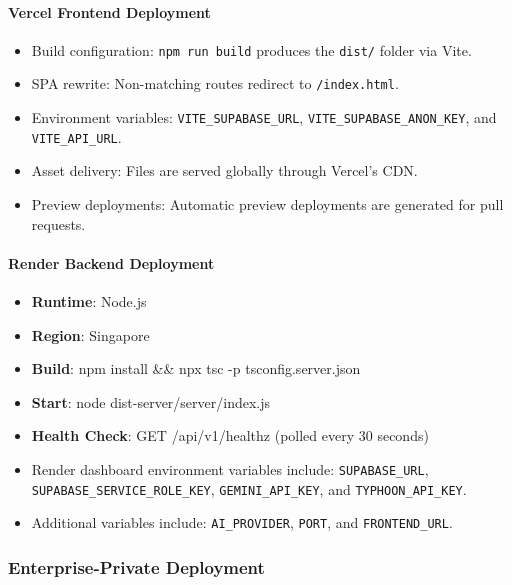 \documentclass[12pt,oneside,openright,a4paper]{cpe-english-project}
\begin{document}
\paragraph{Vercel Frontend Deployment}

\begin{itemize}
\item Build configuration: \texttt{npm run build} produces the \texttt{dist/} folder via Vite.
\item SPA rewrite: Non-matching routes redirect to \texttt{/index.html}.
\item Environment variables: \texttt{VITE\_SUPABASE\_URL}, \texttt{VITE\_SUPABASE\_ANON\_KEY}, and \texttt{VITE\_API\_URL}.
\item Asset delivery: Files are served globally through Vercel's CDN.
\item Preview deployments: Automatic preview deployments are generated for pull requests.
\end{itemize}

\paragraph{Render Backend Deployment}

\begin{itemize}
    \item \textbf{Runtime}: Node.js
    \item \textbf{Region}: Singapore
    \item \textbf{Build}: npm install \&\& npx tsc -p tsconfig.server.json
    \item \textbf{Start}: node dist-server/server/index.js
    \item \textbf{Health Check}: GET /api/v1/healthz (polled every 30 seconds)
\end{itemize}

\begin{itemize}
\item Render dashboard environment variables include: \texttt{SUPABASE\_URL}, \texttt{SUPABASE\_SERVICE\_ROLE\_KEY}, \texttt{GEMINI\_API\_KEY}, and \texttt{TYPHOON\_API\_KEY}.
\item Additional variables include: \texttt{AI\_PROVIDER}, \texttt{PORT}, and \texttt{FRONTEND\_URL}.
\end{itemize}

\subsubsection{Enterprise-Private Deployment}
\end{document}
